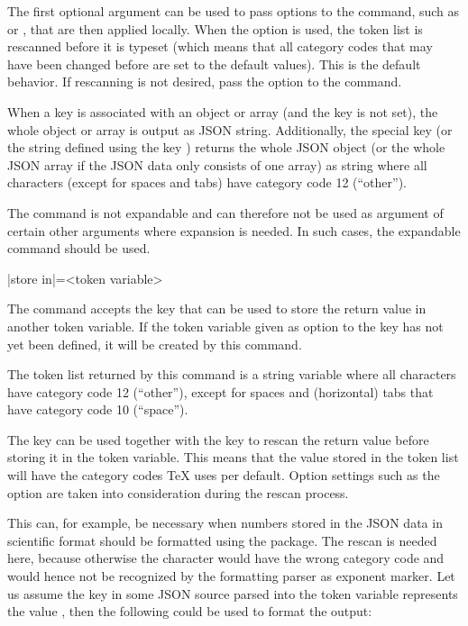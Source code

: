 \documentclass[a4paper]{article}
\begin{document}
{{The first optional argument can be used to pass options to the command, such as  or , that are then applied locally. When the option  is used, the token list is rescanned before it is typeset (which means that all category codes that may have been changed before are set to the default values). This is the default behavior. If rescanning is not desired, pass the option  to the command.

When a key is associated with an object or array (and the key  is not set), the whole object or array is output as JSON string. Additionally, the special key  (or the string defined using the key ) returns the whole JSON object (or the whole JSON array if the JSON data only consists of one array) as string where all characters (except for spaces and tabs) have category code 12 (``other'').

\warning The command \macro{\JSONParseValue} is not expandable and can therefore not be used as argument of certain other arguments where expansion is needed. In such cases, the expandable command \macro{\JSONParseExpandableValue} should be used.

\begin{macrodef}
|store in|={<token variable>}
\end{macrodef}
The command \macro{\JSONParseValue} accepts the key  that can be used to store the return value in another token variable. If the token variable given as option to the  key has not yet been defined, it will be created by this command.

The token list returned by this command is a string variable where all characters have category code 12 (``other''), except for spaces and (horizontal) tabs that have category code 10 (``space'').

The key  can be used together with the key  to rescan the return value before storing it in the token variable. This means that the value stored in the token list will have the category codes TeX uses per default. Option settings such as the  option are taken into consideration during the rescan process.

This can, for example, be necessary when numbers stored in the JSON data in scientific format should be formatted using the  package. The rescan is needed here, because otherwise the character  would have the wrong category code and would hence not be recognized by the formatting parser as exponent marker. Let us assume the key  in some JSON source parsed into the token variable \macro{\myJSONnumber} represents the value , then the following could be used to format the output:

}}
\end{document}
